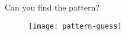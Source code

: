 Can you find the pattern?

\begin{figure}[H]
\centering
\texttt{[image: pattern-guess]}
\end{figure}
